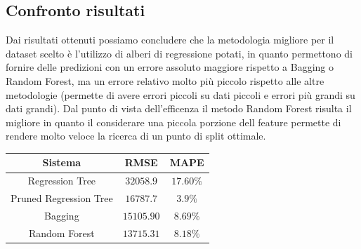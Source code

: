 \documentclass{article}
\begin{document}
    \subsection{Confronto risultati}
    Dai risultati ottenuti possiamo concludere che la metodologia migliore per il
    dataset scelto è l'utilizzo di alberi di regressione potati, in quanto permettono
    di fornire delle predizioni con un errore assoluto maggiore rispetto a Bagging o Random
    Forest, ma un errore relativo molto più piccolo rispetto alle altre metodologie (permette
    di avere errori piccoli su dati piccoli e errori più grandi su dati grandi). Dal punto
    di vista dell'efficenza il metodo Random Forest risulta il migliore in quanto 
    il considerare una piccola porzione dell feature permette di rendere molto 
    veloce la ricerca di un punto di split ottimale.
    \begin{center}
        \begin{tabular}{|c|c|c|}
            \hline
            \textbf{Sistema} & \textbf{RMSE} & \textbf{MAPE} \\
            \hline
            Regression Tree & $32058.9$ &  $17.60\%$ \\
            Pruned Regression Tree  & $16787.7$ &  $3.9\%$ \\
            Bagging  & $15105.90$ &  $8.69\%$ \\
            Random Forest & $13715.31$ &  $8.18\%$ \\
           
           
            \hline
        \end{tabular}
    \end{center}
\end{document}
